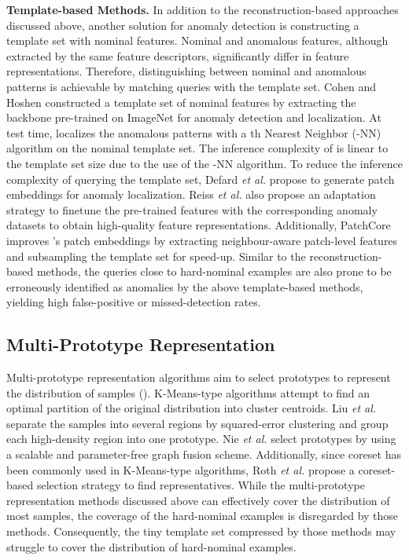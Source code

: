 \documentclass[default,iicol]{sn-jnl}\usepackage[algo2e,ruled,linesnumbered]{algorithm2e}
\theoremstyle{thmstyleone}\newtheorem{theorem}{Theorem}\newtheorem{proposition}[theorem]{Proposition}
\theoremstyle{thmstyletwo}\newtheorem{example}{Example}\newtheorem{remark}{Remark}
\theoremstyle{thmstylethree}\newtheorem{definition}{Definition}
\begin{document}
\noindent\textbf{Template-based Methods. }
In addition to the reconstruction-based approaches discussed above, another solution for anomaly detection is constructing a template set with nominal features.
Nominal and anomalous features, although extracted by the same feature descriptors, significantly differ in feature representations.
Therefore, distinguishing between nominal and anomalous patterns is achievable by matching queries with the template set.
Cohen and Hoshen \cite{SPADE} constructed a template set of nominal features by extracting the backbone pre-trained on ImageNet \cite{imagenet} for anomaly detection and localization.
At test time, \cite{SPADE} localizes the anomalous patterns with a th Nearest Neighbor (-NN) algorithm on the nominal template set.
The inference complexity of \cite{SPADE} is linear to the template set size due to the use of the -NN algorithm.
To reduce the inference complexity of querying the template set, Defard \emph{et al.} \cite{Padim} propose to generate patch embeddings for anomaly localization.
Reiss \emph{et al.} \cite{PANDA} also propose an adaptation strategy to finetune the pre-trained features with the corresponding anomaly datasets to obtain high-quality feature representations.
Additionally, PatchCore \cite{patchcore} improves \cite{Padim}'s patch embeddings by extracting neighbour-aware patch-level features and subsampling the template set for speed-up.
Similar to the reconstruction-based methods, the queries close to hard-nominal examples are also prone to be erroneously identified as anomalies by the above template-based methods, yielding high false-positive or missed-detection rates.

\subsection{Multi-Prototype Representation}
Multi-prototype representation algorithms aim to select  prototypes to represent the distribution of  samples ().
K-Means-type algorithms \cite{kmeans,fuzzy} attempt to find an optimal partition of the original distribution into  cluster centroids.
Liu \emph{et al.} \cite{mpc1} separate the samples into several regions by squared-error clustering and group each high-density region into one prototype.
Nie \emph{et al.} \cite{Nie} select  prototypes by using a scalable and parameter-free graph fusion scheme.
Additionally, since coreset \cite{coreset} has been commonly used in K-Means-type algorithms, Roth \emph{et al.} \cite{patchcore} propose a coreset-based selection strategy to find  representatives.
While the multi-prototype representation methods discussed above can effectively cover the distribution of most samples, the coverage of the hard-nominal examples is disregarded by those methods.
Consequently, the tiny template set compressed by those methods may struggle to cover the distribution of hard-nominal examples.
\end{document}
